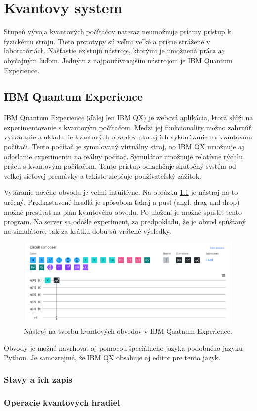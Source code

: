 
\chapter{Kvantovy system}

Stupeň vývoja kvantových počítačov nateraz neumožnuje priamy prístup k
fyzickému stroju. Tieto prototypy sú veľmi veľké a prísne strážené v 
laboratóriách. Našťastie existujú nástroje, ktorými je umožnená práca aj 
obyčajným ľuďom. Jedným z najpoužívanejším nástrojom je IBM Quantum Experience. 

\section{IBM Quantum Experience}
IBM Quantum Experience (ďalej len IBM QX) je webová aplikácia, ktorá 
slúži na experimentovanie s kvantovým počítačom. Medzi jej funkcionality 
možno zahrnúť vytváranie a ukladanie kvantových obvodov ako aj ich 
vykonávanie na kvantovom počítači. Tento počítač je symulovaný virtuálny 
stroj, no IBM QX umožnuje aj odoslanie experimentu na reálny počítač. 
Symulátor umožnuje relatívne rýchlu prácu s kvantovým počítačom. Tento
prístup odľachčuje skutočný systém od veľkej sieťovej premávky a takisto 
zlepšuje používaťeľský zážitok.

Vytáranie nového obvodu je veľmi intuitívne. Na obrázku \ref{ibm_qx_composer}
je nástroj na to určený. Prednastavené hradlá je spôsobom ťahaj a pusť (angl.
drag and drop) možné presúvať na plán kvantového obvodu. Po uložení je možné
spustiť tento program. Na server sa odošle experiment, za predpokladu, že
je obvod spúšťaný na simulátore, tak za krátku dobu sú vrátené výsledky.

\begin{figure} 
	\centering 
	\includegraphics[width=1\textwidth]{figures/ibm_qx_composer.png} 
	\caption{Nástroj na tvorbu kvantových obvodov v IBM Quatnum Experience.}
    \label{ibm_qx_composer}
\end{figure}

Obvody je možné navrhovať aj pomocou špeciálneho jazyka podobného jazyku 
Python. Je samozrejmé, že IBM QX obsahuje aj editor pre tento jazyk.

\subsection{Stavy a ich zapis}
\subsection{Operacie kvantovych hradiel}
